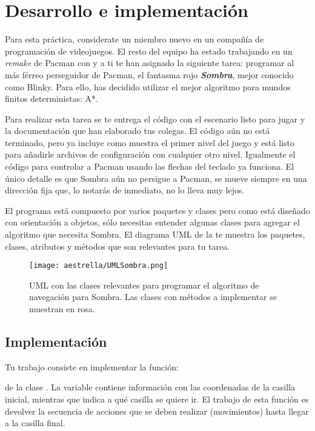 \section{Desarrollo e implementaci\'on}

Para esta práctica, considerate un miembro nuevo en un compañía de programación de videojuegos.  El resto del equipo ha estado trabajando en un \textit{remake} de Pacman con  y a ti te han asignado la siguiente tarea: programar al más férreo perseguidor de Pacman, el fantasma rojo \textbf{\textit{Sombra}}, mejor conocido como Blinky. Para ello, has decidido utilizar el mejor algoritmo para mundos finitos deterministas: A*.

Para realizar esta tarea se te entrega el código con el escenario listo para jugar y la documentación que han elaborado tus colegas.  El código aún no está terminado, pero ya incluye como muestra el primer nivel del juego y está listo para añadirle archivos de configuración con cualquier otro nivel.  Igualmente el código para controlar a Pacman usando las flechas del teclado ya funciona.  El único detalle es que Sombra aún no persigue a Pacman, se mueve siempre en una dirección fija que, lo notarás de inmediato, no lo lleva muy lejos.

El programa está compuesto por varios paquetes y clases pero como está diseñado con orientación a objetos, sólo necesitas entender algunas clases para agregar el algoritmo que necesita Sombra.  El diagrama UML de la  te muestra los paquetes, clases, atributos y métodos que son relevantes para tu tarea.

\begin{sidewaysfigure}
  \centering
  \texttt{[image: aestrella/UMLSombra.png]}
  \caption{UML con las clases relevantes para programar el algoritmo de navegación para Sombra.  Las clases con métodos a implementar se muestran en rosa.}
  \label{fig:umlestrella}
\end{sidewaysfigure}

\subsection{Implementaci\'on}

Tu trabajo consiste en implementar la función:


\noindent de la clase .
La variable  contiene información con las coordenadas de la casilla inicial, mientras que  indica a qué casilla se quiere ir.  El trabajo de esta función es devolver la secuencia de acciones que se deben realizar (movimientos) hasta llegar a la casilla final.


